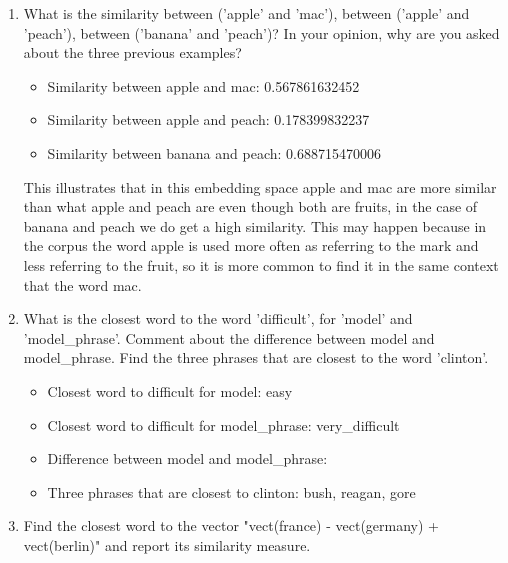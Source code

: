 \documentclass{article} %
\begin{document}
\begin{enumerate}
    \item
    What is the similarity between (’apple’ and ’mac’), between (’apple’ and ’peach’),
    between (’banana’ and ’peach’)? In your opinion, why are you asked about
    the three previous examples?

    \begin{itemize}
        \item
        Similarity between apple and mac: 0.567861632452

        \item
        Similarity between apple and peach: 0.178399832237

        \item
        Similarity between banana and peach: 0.688715470006
    \end{itemize}

    This illustrates that in this embedding space apple and mac are more similar than
    what apple and peach are even though both are fruits, in the case of banana and peach
    we do get a high similarity. This may happen because in the corpus the word apple
    is used more often as referring to the mark and less referring to the fruit, so it
    is more common to find it in the same context that the word mac.

    \item
    What is the closest word to the word 'difficult', for 'model' and 'model\_phrase'.
    Comment about the difference between model and model\_phrase. Find the three phrases
    that are closest to the word 'clinton'.

    \begin{itemize}
        \item
        Closest word to difficult for model: easy

        \item
        Closest word to difficult for model\_phrase: very\_difficult

        \item
        Difference between model and model\_phrase: %

        \item
        Three phrases that are closest to clinton: bush, reagan, gore
    \end{itemize}

    \item
    Find the closest word to the vector "vect(france) - vect(germany) + vect(berlin)" and
    report its similarity measure.


\end{enumerate}
\end{document}
